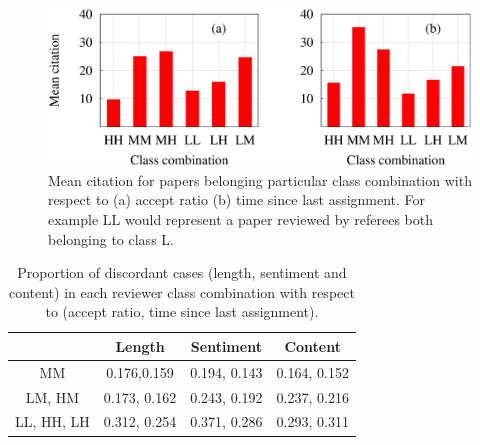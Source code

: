 \begin{figure}
 \centering
 \includegraphics[scale = 0.3]{./texfiles/Chapter_4/cikm_17/figures/ref_performance.eps}
 \caption{\label{ref_perf} Mean citation for papers belonging particular class combination with respect to (a) accept ratio (b) time since last assignment. For example LL would represent a paper reviewed by referees both 
 belonging to class L.}
\end{figure}



\begin{table}
\centering
\caption{Proportion of discordant cases (length, sentiment and content) in each reviewer class combination with respect to (accept ratio, time since 
last assignment). }
\label{tab:dis}
\begin{tabular}{c|c|c|c}
\hline
           & Length       & Sentiment    & Content      \\ \hline
MM         & 0.176,0.159  & 0.194, 0.143 & 0.164, 0.152 \\ 
LM, HM     & 0.173, 0.162 & 0.243, 0.192 & 0.237, 0.216 \\ 
LL, HH, LH & 0.312, 0.254 & 0.371, 0.286 & 0.293, 0.311 \\ \hline
\end{tabular} 
\end{table}



\medskip
